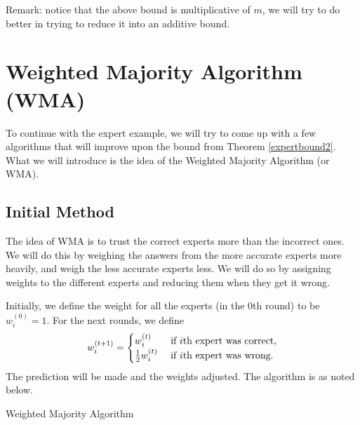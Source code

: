 \documentclass[12pt]{article}
\begin{document}
Remark: notice that the above bound is multiplicative of $m$, we will try to do better in trying to reduce it into an additive bound.

\section{Weighted Majority Algorithm (WMA)}

To continue with the expert example, we will try to  come up with a few algorithms that will improve upon the bound from Theorem \ref{expertbound2}. What we will introduce is the idea of the Weighted Majority Algorithm (or WMA).

\subsection{Initial Method}

The idea of WMA is to trust the correct experts more than the incorrect ones. We will do this by weighing the answers from the more accurate experts more heavily, and weigh the less accurate experts less. We will do so by assigning weights to the different experts and reducing them when they get it wrong.

Initially, we define the weight for all the experts (in the $0$th round) to be $w_i^{(0)} =1$. For the next rounds, we define
$$
w_i^{(t+1)} = \begin{cases}
w_i^{(t)} &\textmd{ if $i$th expert was correct,} \\
\frac{1}{2}w_i^{(t)} & \text{ if $i$th expert was wrong.}
\end{cases}
$$
The prediction will be made and the weights adjusted. The algorithm is as noted below.

\begin{algorithm}[H]
	\caption{Weighted Majority Algorithm}
	\label{alg1}
	\begin{algorithmic}[1]
		\Else
		\EndIf
		\EndFor
		\EndFunction
	\end{algorithmic}
\end{algorithm}
\end{document}
